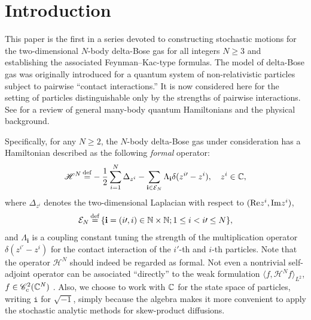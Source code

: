\documentclass[12pt, twoside]{article}
\renewcommand{\cftsecleader}{\cftdotfill{\cftdotsep}}
\numberwithin{figure}{section}
\renewcommand{\Re}{{\rm Re}}
\renewcommand{\Im}{{\rm Im}}
\newcommand{\1}{\mathds 1}
\newcommand{\C}{{\mathscr C}}
\newcommand{\la}{{\langle}}
\newcommand{\ra}{{\rangle}}
\newcommand{\ms}{\mathscr}
\newcommand{\mc}{\mathcal}
\newcommand{\2}{{\mathbf 1}}
\renewcommand{\i}{{\mathtt i}}
\newcommand{\defeq}{{\stackrel{\rm def}{=}}}
\newcommand{\bi}{\mathbf i}
\newcommand{\CN}{{\mathbb C}^{\it N}}
\begin{document}
\setlength{\cftbeforesecskip}{0pt}
\setlength\cftaftertoctitleskip{0pt}
\renewcommand{\cftsecleader}{\cftdotfill{\cftdotsep}}
\setcounter{tocdepth}{2}
\tableofcontents




\section{Introduction}\label{sec:intro}
This paper is the first in a series devoted to constructing stochastic motions for the two-dimensional $N$-body delta-Bose gas for all integers $N\geq 3$ and establishing the associated Feynman--Kac-type formulas.  The model of delta-Bose gas was originally introduced for a quantum system of non-relativistic particles subject to pairwise ``contact interactions.'' It is now considered here for the setting of particles distinguishable only by the strengths of pairwise interactions. See \cite{Suth:Model} for a review of general many-body quantum Hamiltonians and the physical background. 

Specifically, for any $N\geq 2$, the $N$-body delta-Bose gas under consideration has a Hamiltonian described as the following \emph{formal} operator:
\begin{align}\label{def:HN}
\ms H^N\,\defeq -\frac{1}{2}\sum_{i=1}^N\Delta_{z^i}-\sum_{\bi\in \mathcal E_N}\Lambda_\bi \delta(z^{i\prime}-z^i),\quad z^i\in \Bbb C,
\end{align}
where $\Delta_{z^i}$ denotes the two-dimensional Laplacian with respect to $(\Re z^i,\Im z^i)$,
\begin{align}\label{def:EN}
\mc E_N\,\defeq\, \{\bi=(i\prime,i)\in\Bbb N\times \Bbb N;1\leq i<i\prime \leq N\},
\end{align}
and $\Lambda_\bi$ is a coupling constant tuning the strength of the multiplication operator $\delta(z^{i\prime}-z^i)$ for the contact interaction of the $i\prime$-th and $i$-th particles. Note that the operator $\ms H^N$ should indeed be regarded as formal. Not even a nontrivial self-adjoint operator can be associated ``directly'' to the weak formulation $\la f, \ms H^N f\ra_{L^2}$, $f\in \C^2_c(\CN)$ \cite[Section~2]{DFT:Schrodinger}. Also, we choose to work with $\Bbb C$ for the state space of particles, writing $\i$ for $\sqrt{-1}$, simply because the algebra makes it more convenient to apply the stochastic analytic methods for skew-product diffusions.
\end{document}
